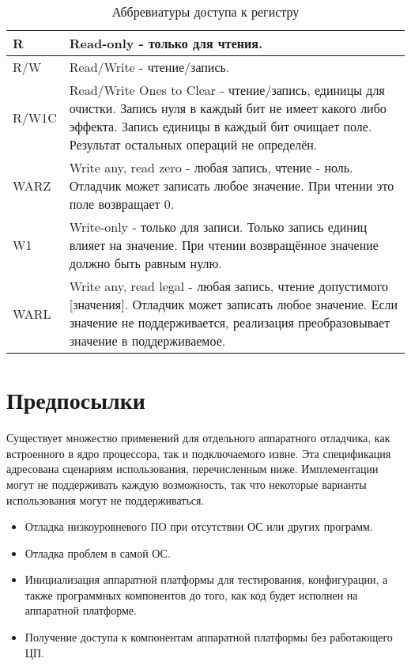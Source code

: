 \begin{table}[htp]
    \centering
    \caption{Аббревиатуры доступа к регистру}
    \label{tab:access}
    \begin{tabulary}{\textwidth}{|l|L|}
        \hline
        R & Read-only - только для чтения. \\
        \hline
        R/W & Read/Write - чтение/запись. \\
        \hline
        R/W1C & Read/Write Ones to Clear - чтение/запись, единицы для очистки.
        Запись нуля в каждый бит не имеет какого либо эффекта.
        Запись единицы в каждый бит очищает поле. Результат остальных операций
        не определён. \\
        \hline
        WARZ & Write any, read zero - любая запись, чтение - ноль.
        Отладчик может записать любое значение. При чтении
        это поле возвращает 0. \\
        \hline
        W1 & Write-only - только для записи.
        Только запись единиц влияет на значение. При чтении возвращённое
        значение должно быть равным нулю. \\
        \hline
        WARL & Write any, read legal - любая запись, чтение допустимого [значения].
        Отладчик может записать любое значение. Если значение
        не поддерживается, реализация преобразовывает значение в поддерживаемое. \\
        \hline
    \end{tabulary}
\end{table}

%

\section{Предпосылки}

Существует множество применений для отдельного аппаратного отладчика, как
встроенного в ядро процессора, так и подключаемого извне.
Эта спецификация адресована сценариям использования, перечисленным ниже. Имплементации
могут не поддерживать каждую возможность, так что некоторые варианты использования
могут не поддерживаться.

\begin{itemize}

\item Отладка низкоуровневого ПО при отсутствии ОС или других программ.

\item Отладка проблем в самой ОС.

\item Инициализация аппаратной платформы для тестирования, конфигурации, а также программных
  компонентов до того, как код будет исполнен на аппаратной платформе.

\item Получение доступа к компонентам аппаратной платформы без работающего ЦП.

\end{itemize}

